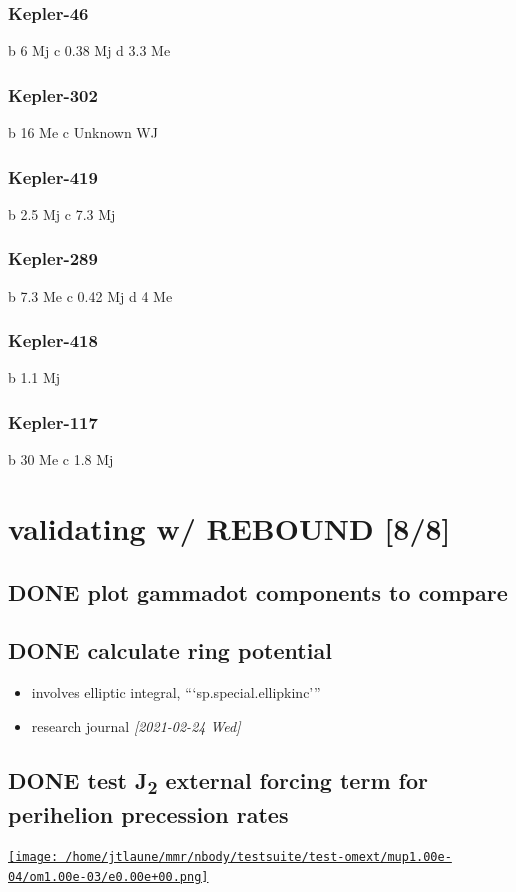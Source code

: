 \documentclass[11pt]{article}
\begin{document}
\subsubsection{Kepler-46}
\label{sec:org4ec1eb6}
b 6 Mj
c 0.38 Mj
d 3.3 Me
\subsubsection{Kepler-302}
\label{sec:org6d15e52}
b 16 Me
c Unknown WJ
\subsubsection{Kepler-419}
\label{sec:org33c5ff8}
b 2.5 Mj
c 7.3 Mj
\subsubsection{Kepler-289}
\label{sec:orgb01285a}
b 7.3 Me
c 0.42 Mj
d 4 Me
\subsubsection{Kepler-418}
\label{sec:org2349b6e}
b 1.1 Mj
\subsubsection{Kepler-117}
\label{sec:org58596b9}
b 30 Me
c 1.8 Mj
\section{validating w/ REBOUND [8/8]}
\label{sec:org607a093}
\subsection{{\bfseries\sffamily DONE} plot gammadot components to compare}
\label{sec:org377231b}
\subsection{{\bfseries\sffamily DONE} calculate ring potential}
\label{sec:org7986dd0}
\begin{itemize}
\item involves elliptic integral, ```sp.special.ellipkinc'''
\item research journal \textit{[2021-02-24 Wed] }
\end{itemize}
\subsection{{\bfseries\sffamily DONE} test J\textsubscript{2} external forcing term for perihelion precession rates}
\label{sec:orgb481e5b}
\href{nbody/testsuite/test-omext/mup1.00e-04/om1.00e-03/e0.00e+00.png}{\texttt{[image: /home/jtlaune/mmr/nbody/testsuite/test-omext/mup1.00e-04/om1.00e-03/e0.00e+00.png]}}
\end{document}
